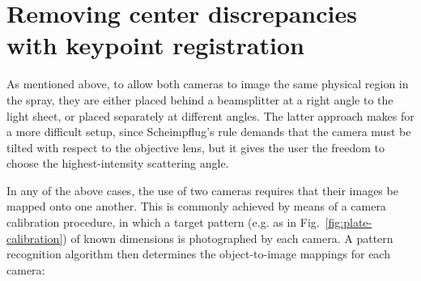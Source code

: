 \documentclass[11.5pt,oneside]{book}
\newcommand*{\figref}[1]{Fig.~\ref{#1}}
\begin{document}
\section{Removing center discrepancies with keypoint registration}
\label{sec:keypoint-registration}

As mentioned above, to allow both cameras to image the same physical region in
the spray, they are either placed behind a beamsplitter at a right angle to the
light sheet, or placed separately at different angles. The latter approach makes
for a more difficult setup, since Scheimpflug's rule demands that the camera
must be tilted with respect to the objective lens, but it gives the user the
freedom to choose the highest-intensity scattering angle.

In any of the above cases, the use of two cameras requires that their images be
mapped onto one another. This is commonly achieved by means of a camera
calibration procedure, in which a target pattern (e.g. as in \figref{fig:plate-calibration}) of known dimensions is
photographed by each camera. A pattern recognition algorithm then determines the
object-to-image mappings for each camera:
\end{document}
